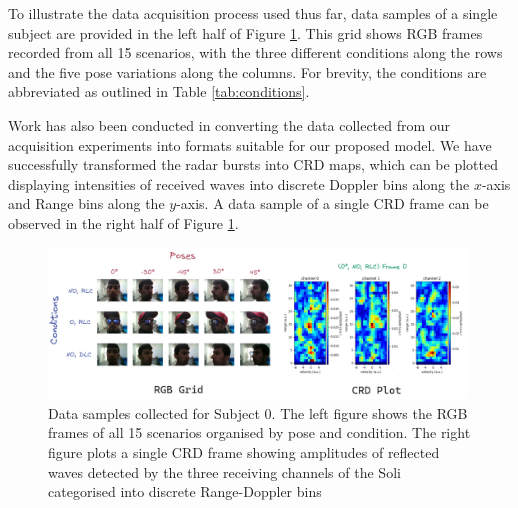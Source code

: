 \documentclass{interim}
\begin{document}
To illustrate the data acquisition process used thus far, data samples of a single subject are provided in the left half of Figure \ref{fig:rgb_crd_plot}. This grid shows RGB frames recorded from all 15 scenarios, with the three different conditions along the rows and the five pose variations along the columns. For brevity, the conditions are abbreviated as outlined in Table \ref{tab:conditions}.

\begin{table}[h!]
    \centering
    \caption{Table displaying full forms for abbreviations describing experiment conditions.}
    \label{tab:conditions}
\end{table}

Work has also been conducted in converting the data collected from our acquisition experiments into formats suitable for our proposed model. We have successfully transformed the radar bursts into CRD maps, which can be plotted displaying intensities of received waves into discrete Doppler bins along the $x$-axis and Range bins along the $y$-axis. A data sample of a single CRD frame can be observed in the right half of Figure \ref{fig:rgb_crd_plot}.

\begin{figure}[H]
    \centering
    \includegraphics[width=0.99\textwidth]{images/CRD_RGB_plot.pdf}
    \caption{Data samples collected for Subject 0. The left figure shows the RGB frames of all 15 scenarios organised by pose and condition. The right figure plots a single CRD frame showing amplitudes of reflected waves detected by the three receiving channels of the Soli categorised into discrete Range-Doppler bins}
    \label{fig:rgb_crd_plot}
\end{figure}
\end{document}
